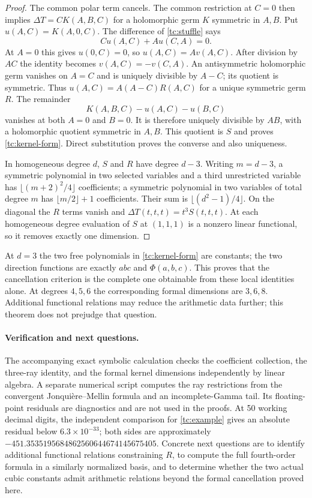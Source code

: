 \documentclass[11pt,a4paper]{article}
\numberwithin{equation}{section}
\theoremstyle{plain}
\theoremstyle{definition}
\theoremstyle{remark}
\begin{document}
\begin{proof}
The common polar term cancels.  The common restriction at $C=0$
then implies $\Delta T=C K(A,B,C)$ for a holomorphic germ $K$
symmetric in $A,B$.  Put $u(A,C)=K(A,0,C)$.  The difference of
\eqref{tc:stuffle} says
\[
 C u(A,C)+A u(C,A)=0.
\]
At $A=0$ this gives $u(0,C)=0$, so $u(A,C)=A v(A,C)$.
After division by $AC$ the identity becomes
$v(A,C)=-v(C,A)$.  An antisymmetric holomorphic germ vanishes on
$A=C$ and is uniquely divisible by $A-C$; its quotient is symmetric.
Thus $u(A,C)=A(A-C)R(A,C)$ for a unique symmetric germ $R$.
The remainder
\[
 K(A,B,C)-u(A,C)-u(B,C)
\]
vanishes at both $A=0$ and $B=0$.  It is therefore uniquely divisible
by $AB$, with a holomorphic quotient symmetric in $A,B$.  This
quotient is $S$ and proves \eqref{tc:kernel-form}.  Direct substitution
proves the converse and also uniqueness.

In homogeneous degree $d$, $S$ and $R$ have degree $d-3$.
Writing $m=d-3$, a symmetric polynomial in two selected variables
and a third unrestricted variable has
$\lfloor(m+2)^2/4\rfloor$ coefficients; a symmetric polynomial in
two variables of total degree $m$ has $\lfloor m/2\rfloor+1$
coefficients.  Their sum is $\lfloor(d^2-1)/4\rfloor$.
On the diagonal the $R$ terms vanish and
$\Delta T(t,t,t)=t^3S(t,t,t)$.  At each homogeneous degree evaluation
of $S$ at $(1,1,1)$ is a nonzero linear functional, so it removes
exactly one dimension.
\end{proof}

At $d=3$ the two free polynomials in \eqref{tc:kernel-form} are
constants; the two direction functions are exactly $abc$ and
$\Phi(a,b,c)$.  This proves that the cancellation criterion is the
complete one obtainable from these local identities alone.  At
degrees $4,5,6$ the corresponding formal dimensions are $3,6,8$.
Additional functional relations may reduce the arithmetic data
further; this theorem does not prejudge that question.

\paragraph{Verification and next questions.}
The accompanying exact symbolic calculation checks the coefficient
collection, the three-ray identity, and the formal kernel dimensions
independently by linear algebra.  A separate numerical script computes
the ray restrictions from the convergent Jonqui\`ere--Mellin formula
and an incomplete-Gamma tail.  Its floating-point residuals are
diagnostics and are not used in the proofs.  At 50 working decimal
digits, the independent comparison for \eqref{tc:example} gives
an absolute residual below $6.3\times10^{-33}$; both sides are
approximately $-451.3535195684862560644674145675405$.
Concrete next questions
are to identify additional functional relations constraining $R$,
to compute the full fourth-order formula in a similarly normalized
basis, and to determine whether the two actual cubic constants admit
arithmetic relations beyond the formal cancellation proved here.
\end{document}
